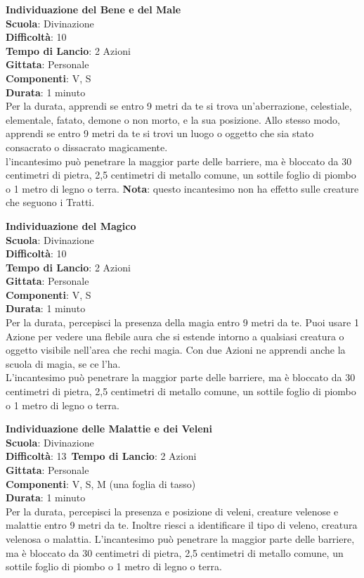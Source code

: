\begin{multicols}{2}
\medskip\textbf{Individuazione del Bene e del Male}\\
\textbf{Scuola}: Divinazione\\
\textbf{Difficoltà}: 10\\
\textbf{Tempo di Lancio}: 2 Azioni\\
\textbf{Gittata}: Personale\\
\textbf{Componenti}: V, S\\
\textbf{Durata}: 1 minuto\\
Per la durata, apprendi se entro 9 metri da te si trova un'aberrazione, celestiale, elementale, fatato, demone o non morto, e la sua posizione. Allo stesso modo, apprendi se entro 9 metri da te si trovi un luogo o oggetto che sia stato consacrato o dissacrato magicamente.\\
l'incantesimo può penetrare la maggior parte delle barriere, ma è bloccato da 30 centimetri di pietra, 2,5 centimetri di metallo comune, un sottile foglio di piombo o 1 metro di legno o terra. 
\textbf{Nota}: questo incantesimo non ha effetto sulle creature che seguono i Tratti.

\medskip\textbf{Individuazione del Magico}\\
\textbf{Scuola}: Divinazione\\
\textbf{Difficoltà}: 10\\
\textbf{Tempo di Lancio}: 2 Azioni\\
\textbf{Gittata}: Personale\\
\textbf{Componenti}: V, S\\
\textbf{Durata}: 1 minuto\\
Per la durata, percepisci la presenza della magia entro 9 metri da te. Puoi usare 1 Azione per vedere una flebile aura che si estende intorno a qualsiasi creatura o oggetto visibile nell'area che rechi magia. Con due Azioni ne apprendi anche la scuola di magia, se ce l'ha.\\
L'incantesimo può penetrare la maggior parte delle barriere, ma è bloccato da 30 centimetri di pietra, 2,5 centimetri di metallo comune, un sottile foglio di piombo o 1 metro di legno o terra.

\medskip\textbf{Individuazione delle Malattie e dei Veleni}\\
\textbf{Scuola}: Divinazione\\
\textbf{Difficoltà}: 13\
\textbf{Tempo di Lancio}: 2 Azioni\\
\textbf{Gittata}: Personale\\
\textbf{Componenti}: V, S, M (una foglia di tasso)\\
\textbf{Durata}: 1 minuto\\
Per la durata, percepisci la presenza e posizione di veleni, creature velenose e malattie entro 9 metri da te. Inoltre riesci a identificare il tipo di veleno, creatura velenosa o malattia. L'incantesimo può penetrare la maggior parte delle barriere, ma è bloccato da 30 centimetri di pietra, 2,5 centimetri di metallo comune, un sottile foglio di piombo o 1 metro di legno o terra.


\end{multicols}
